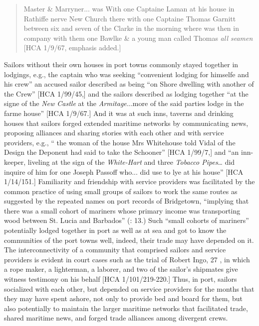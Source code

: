 \begin{quotation}
Master \& Marryner... was With one Captaine Laman at his house in Rathiffe nerve New Church there with one Captaine Thomas Garnitt between six and seven of the Clarke in the morning where was then in company with them one Bawlke \& a young man called Thomas \textit{all seamen} [HCA 1/9/67, emphasis added.] \end{quotation}

Sailors without their own houses in port towns commonly stayed together in lodgings, e.g., the captain who was seeking “convenient lodging for himselfe and his crew” \citep[11,]{Gage1648} an accused sailor described as being “on Shore dwelling with another of the Crew” [HCA 1/99/45,] and the sailors described as lodging together “at the signe of the \textit{New Castle} at the \textit{Armitage.}..more of the said parties lodge in the farme house” [HCA 1/9/67.] And it was at such inns, taverns and drinking houses that sailors forged extended maritime networks by communicating news, proposing alliances and sharing stories with each other and with service providers, e.g., “ the woman of the house Mrs Whitehouse told Vidal of the Design the Deponent had said to take the Schooner” [HCA 1/99/7,] and “an inn-keeper, liveling at the sign of the \textit{White-Hart} and three \textit{Tobacco Pipes}… did inquire of him for one Joseph Passoff who... did use to lye at his house” [HCA 1/14/151.] Familiarity and friendship with service providers was facilitated by the common practice of using small groups of sailors to work the same routes as suggested by the repeated names on port records of Bridgetown, “implying that there was a small cohort of mariners whose primary income was transporting wood between St. Lucia and Barbados” (\citealt{Draper2016}: 13.) Such “small cohorts of mariners” potentially lodged together in port as well as at sea and got to know the communities of the port towns well, indeed, their trade may have depended on it. The interconnectivity of a community that comprised sailors and service providers is evident in court cases such as the trial of Robert Ingo, 27 \citealt{May1636}, in which a rope maker, a lighterman, a laborer, and two of the sailor’s shipmates give witness testimony on his behalf [HCA 1/101/219-220.] Thus, in port, sailors socialized with each other, but depended on service providers for the months that they may have spent ashore, not only to provide bed and board for them, but also potentially to maintain the larger maritime networks that facilitated trade, shared maritime news, and forged trade alliances among divergent crews. 

